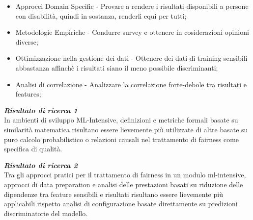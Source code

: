 	\begin{itemize}
	    \item Approcci Domain Specific - Provare a rendere i risultati disponibili a persone con disabilità, quindi in sostanza, renderli equi per tutti; 
	    \item Metodologie Empiriche - Condurre survey e ottenere in cosiderazioni opinioni diverse;
	    \item Ottimizzazione nella gestione dei dati - Ottenere dei dati di training sensibili abbastanza affinchè i risultati siano il meno possibile discriminanti;
	    \item Analisi di correlazione - Analizzare la correlazione forte-debole tra risultati e features;
	\end{itemize}
    
	
	
	\begin{center}
	
        \begin{tcolorbox}[width=\textwidth, colframe=black, colback=Gray]
    			\begin{minipage}{\textwidth}
    				\textit{\faKey  \textbf{ Risultato di ricerca 1}}\\
    				In ambienti di sviluppo ML-Intensive, definizioni e metriche formali basate su similarità matematica risultano essere lievemente più utilizzate di altre basate su puro calcolo probabilistico o relazioni causali nel trattamento di fairness come specifica di qualità.
    			
    			\end{minipage}
		\end{tcolorbox}
	\end{center}
	
	\begin{center}
	
        \begin{tcolorbox}[width=\textwidth, colframe=black, colback=Gray]
    			\begin{minipage}{\textwidth}
    				\textit{\faKey  \textbf{ Risultato di ricerca 2}}\\
    				Tra gli approcci pratici per il trattamento di fairness in un modulo ml-intensive, approcci di data preparation e analisi delle prestazioni basati su riduzione delle dipendenze tra feature sensibili e risultati risultano essere lievemente più applicabili rispetto analisi di configurazione basate direttamente su predizioni discriminatorie del modello.
    			
    			\end{minipage}
		\end{tcolorbox}
	\end{center}
	
